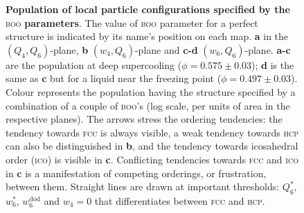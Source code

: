 \begin{figure}
	\caption{\textbf{Population of local particle configurations specified by the }\textsc{boo}\textbf{ parameters}. The value of \textsc{boo} parameter for a perfect structure is  indicated by its name's position on each map. \textbf{a} in the $(Q_4,Q_6)$-plane, \textbf{b} $(w_4,Q_6)$-plane and \textbf{c-d} $(w_6,Q_6)$-plane. \textbf{a-c} are the population at deep supercooling ($\phi=0.575\pm 0.03$); \textbf{d} is the same as \textbf{c} but for a liquid near the freezing point ($\phi = 0.497 \pm 0.03$). Colour represents the population having the structure  specified by a combination of a couple of \textsc{boo}'s (log scale, per units of area in the respective planes). The arrows stress the ordering tendencies: the tendency towards \textsc{fcc} is always visible, a weak tendency towards \textsc{hcp} can also be distinguished in \textbf{b}, and the tendency towards icosahedral order (\textsc{ico}) is visible in \textbf{c}. 
Conflicting tendencies towards \textsc{fcc} and \textsc{ico} in \textbf{c} is a manifestation of competing orderings, or frustration, between them. Straight lines are drawn at important thresholds: $Q_6^*$, $w_6^*$, $w_6^\text{dod}$ and $w_4=0$ that differentiates between \textsc{fcc} and \textsc{hcp}.}
	\label{fig:maps}
\end{figure}
\tikzset{external/force remake=false}
